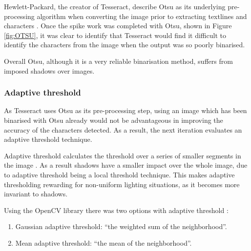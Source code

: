 Hewlett-Packard, the creator of Tesseract, describe Otsu as its underlying pre-processing algorithm when converting the image prior to extracting textlines and characters \cite{citeulike:13931186}. Once the spike work was completed with Otsu, shown in Figure \ref{fig:OTSU}, it was clear to identify that Tesseract would find it difficult to identify the characters from the image when the output was so poorly binarised.

Overall Otsu, although it is a very reliable binarisation method, suffers from imposed shadows over images.

\subsubsection{Adaptive threshold} \label{section:threshold}
As Tesseract uses Otsu as its pre-processing step, using an image which has been binarised with Otsu already would not be advantageous in improving the accuracy of the characters detected. As a result, the next iteration evaluates an adaptive threshold technique.

Adaptive threshold calculates the threshold over a series of smaller segments in the image \cite{citeulike:14021401}. As a result shadows have a smaller impact over the whole image, due to adaptive threshold being a local threshold technique. This makes adaptive thresholding rewarding for non-uniform lighting situations, as it becomes more invariant to shadows.

Using the OpenCV library there was two options with adaptive threshold \cite{citeulike:14021409}:
\begin{enumerate}
  \item Gaussian adaptive threshold: ``the weighted sum of the neighborhood''.
  \item Mean adaptive threshold: ``the mean of the neighborhood''.
\end{enumerate}

